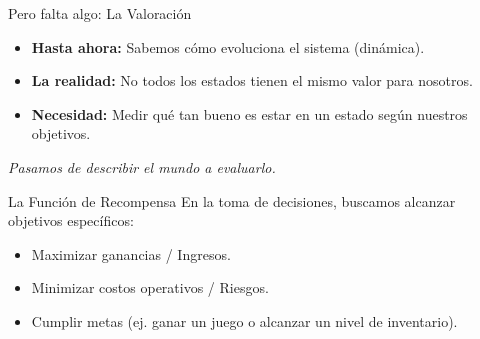 \documentclass[xcolor=dvipsnames]{beamer}
\begin{document}

\begin{frame}{Pero falta algo: La Valoración}
\begin{itemize}
    \item \textbf{Hasta ahora:} Sabemos cómo evoluciona el sistema (dinámica).
    \item<2-> \textbf{La realidad:} No todos los estados tienen el mismo valor para nosotros.
    \item<3-> \textbf{Necesidad:} Medir qué tan bueno es estar en un estado según nuestros objetivos.
\end{itemize}

\vspace{0.4cm}
\begin{center}
    \textit{Pasamos de describir el mundo a evaluarlo.}
\end{center}
\end{frame}

\begin{frame}{La Función de Recompensa}
En la toma de decisiones, buscamos alcanzar objetivos específicos:
\begin{itemize}
    \item<2-> Maximizar ganancias / Ingresos.
    \item<3-> Minimizar costos operativos / Riesgos.
    \item<4-> Cumplir metas (ej. ganar un juego o alcanzar un nivel de inventario).
\end{itemize}

\vspace{0.3cm}
\end{frame}
\end{document}
